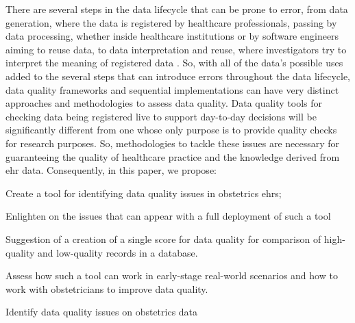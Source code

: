 There are several steps in the data lifecycle that can be prone to error, from data generation, where the data is registered by healthcare professionals, passing by data processing, whether inside healthcare institutions or by software engineers aiming to reuse data, to data interpretation and reuse, where investigators
try to interpret the meaning of registered data \cite{wengClinicalDataQuality2020}.
So, with all of the data’s possible uses added to the several steps that can introduce errors throughout the data lifecycle, data quality frameworks and sequential implementations can have very distinct approaches and methodologies to assess data quality. Data quality tools for checking data being registered live to support day-to-day decisions will be significantly different from one whose only purpose is to provide quality checks for research purposes. So, methodologies to tackle these issues are necessary for guaranteeing the quality of healthcare practice and the knowledge derived from \ac{ehr} data. Consequently, in this paper, we propose:
\begin{myitemize}
    \item Create a tool for identifying data quality issues in obstetrics \acp{ehr};
    \item Enlighten on the issues that can appear with a full deployment of such a tool
    \item Suggestion of a creation of a single score for data quality for comparison of high-quality and low-quality records in a database.
    \item Assess how such a tool can work in early-stage real-world scenarios and how to work with obstetricians to improve data quality.
    \item Identify data quality issues on obstetrics data
\end{myitemize}




